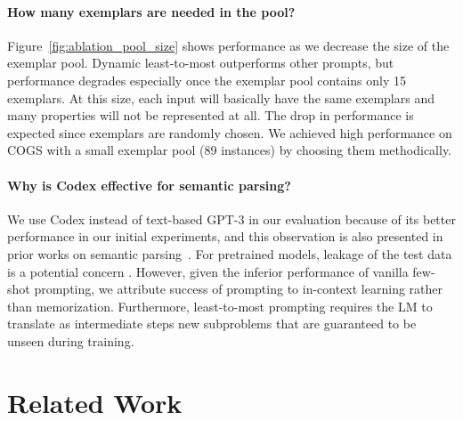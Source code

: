 \documentclass{article} \usepackage{iclr2022_conference,times}
\begin{document}
\paragraph{How many exemplars are needed in the pool?} 

Figure~\ref{fig:ablation_pool_size} shows performance as we decrease the size of the exemplar pool. Dynamic least-to-most outperforms other prompts, but performance degrades especially once the exemplar pool contains only 15 exemplars. At this size, each input will basically have the same exemplars and many properties will not be represented at all. The drop in performance is expected since exemplars are randomly chosen. We achieved high performance on COGS with a small exemplar pool (89 instances) by choosing them methodically. 





\paragraph{Why is Codex effective for semantic parsing?} 

We use Codex instead of text-based GPT-3 in our evaluation because of its better performance in our initial experiments, and this observation is also presented in prior works on semantic parsing~\citep{shin-etal-2021-constrained,shin-van-durme-2022-shot}. For pretrained models, leakage of the test data is a potential concern \citep{Krishna2020Thieves,carlini21extracting}. However, given the inferior performance of vanilla few-shot prompting, we attribute success of prompting to in-context learning rather than memorization. Furthermore, least-to-most prompting requires the LM to translate as intermediate steps new subproblems that are guaranteed to be unseen during training.



\section{Related Work}
\end{document}
